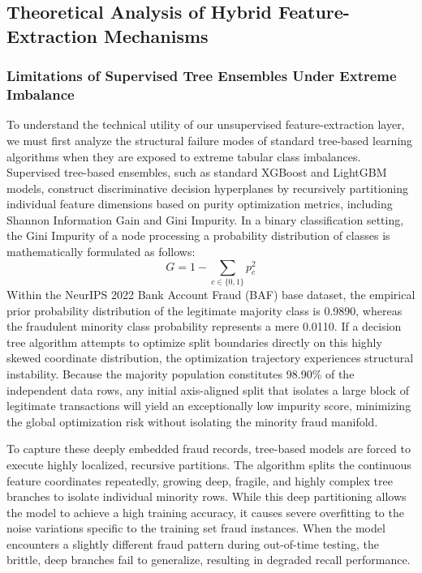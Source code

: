 \subsection{Theoretical Analysis of Hybrid Feature-Extraction Mechanisms}

\subsubsection{Limitations of Supervised Tree Ensembles Under Extreme Imbalance}

To understand the technical utility of our unsupervised feature-extraction layer, we must first analyze the structural failure modes of standard tree-based learning algorithms when they are exposed to extreme tabular class imbalances. Supervised tree-based ensembles, such as standard XGBoost and LightGBM models, construct discriminative decision hyperplanes by recursively partitioning individual feature dimensions based on purity optimization metrics, including Shannon Information Gain and Gini Impurity. In a binary classification setting, the Gini Impurity of a node processing a probability distribution of classes is mathematically formulated as follows:
\begin{equation}\label{eq:7.17}
    G = 1 - \sum_{c \in \{0,1\}} p_c^2
\end{equation}
Within the NeurIPS 2022 Bank Account Fraud (BAF) base dataset, the empirical prior probability distribution of the legitimate majority class is 0.9890, whereas the fraudulent minority class probability represents a mere 0.0110. If a decision tree algorithm attempts to optimize split boundaries directly on this highly skewed coordinate distribution, the optimization trajectory experiences structural instability. Because the majority population constitutes 98.90\% of the independent data rows, any initial axis-aligned split that isolates a large block of legitimate transactions will yield an exceptionally low impurity score, minimizing the global optimization risk without isolating the minority fraud manifold.

To capture these deeply embedded fraud records, tree-based models are forced to execute highly localized, recursive partitions. The algorithm splits the continuous feature coordinates repeatedly, growing deep, fragile, and highly complex tree branches to isolate individual minority rows. While this deep partitioning allows the model to achieve a high training accuracy, it causes severe overfitting to the noise variations specific to the training set fraud instances. When the model encounters a slightly different fraud pattern during out-of-time testing, the brittle, deep branches fail to generalize, resulting in degraded recall performance.

